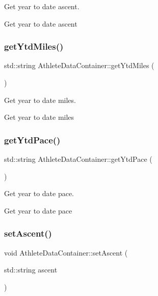 Get year to date ascent. 

Get year to date ascent \mbox{\label{classAthleteDataContainer_a708d78fd02b93cb9b27a358f7ff458fa}} 
\subsubsection{\texorpdfstring{getYtdMiles()}{getYtdMiles()}}
{\footnotesize\ttfamily std\+::string Athlete\+Data\+Container\+::get\+Ytd\+Miles (\begin{DoxyParamCaption}{ }\end{DoxyParamCaption})}



Get year to date miles. 

Get year to date miles \mbox{\label{classAthleteDataContainer_a8fd9730db3fab2070542226a09eba5ea}} 
\subsubsection{\texorpdfstring{getYtdPace()}{getYtdPace()}}
{\footnotesize\ttfamily std\+::string Athlete\+Data\+Container\+::get\+Ytd\+Pace (\begin{DoxyParamCaption}{ }\end{DoxyParamCaption})}



Get year to date pace. 

Get year to date pace \mbox{\label{classAthleteDataContainer_a5ac88d8d2c30423cbe91c5de730684d8}} 
\subsubsection{\texorpdfstring{setAscent()}{setAscent()}}
{\footnotesize\ttfamily void Athlete\+Data\+Container\+::set\+Ascent (\begin{DoxyParamCaption}\item[{std\+::string}]{ascent }\end{DoxyParamCaption})}



